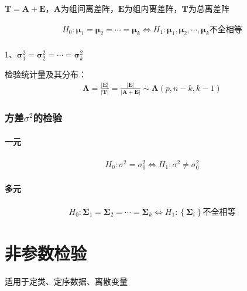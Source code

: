 \documentclass[12pt]{book}
\begin{document}
$\mathbf{T}=\mathbf{A}+\mathbf{E}$，$\mathbf{A}$为组间离差阵，$\bm{E}$为组内离差阵，$\bm{T}$为总离差阵

\begin{gather*}
    H_0:\bm{\mu}_1=\bm{\mu}_2=\cdots=\bm{\mu}_k	\Leftrightarrow H_1:\bm{\mu}_1,\bm{\mu}_2,\cdots,\bm{\mu}_k不全相等 \\
\end{gather*}


1、$\bm{\sigma}_1^2=\bm{\sigma}_2^2=\cdots=\bm{\sigma}_k^2$

检验统计量及其分布：
\begin{gather*}
    \bm{\Lambda}=\frac{\left|\bm{E}\right|}{\left|\bm{T}\right|}=\frac{\left|\bm{E}\right|}{\left|\bm{A}+\bm{E}\right|} \sim\bm{\Lambda}(p,n-k,k-1)
\end{gather*}


\subsubsection{方差$\sigma^2$的检验}

\paragraph{一元}

\begin{gather*}
    H_0:\sigma^2=\sigma_0^2 \Leftrightarrow	H_1:\sigma^2\neq\sigma_0^2
\end{gather*}


\paragraph{多元}

\begin{gather*}
    H_0:\bm{\Sigma}_1=\bm{\Sigma}_2=\cdots=\bm{\Sigma}_k\Leftrightarrow H_1:\left\{\bm{\Sigma}_i\right\}\text{不全相等}
\end{gather*}















\section{非参数检验}

适用于定类、定序数据、离散变量
\end{document}
